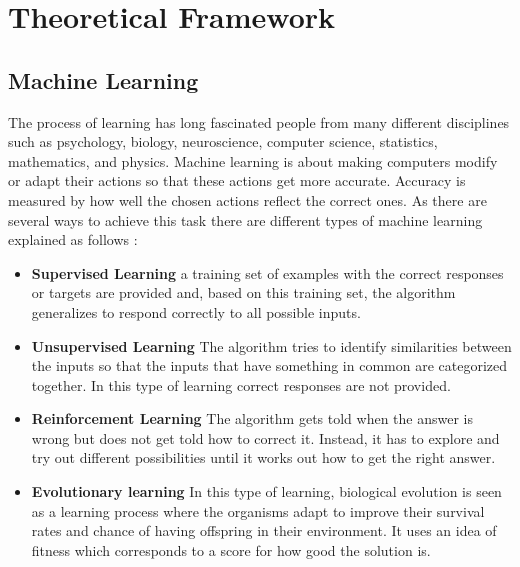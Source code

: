 \chapter{Theoretical Framework}
\label{ch:theosm}



\section{Machine Learning}

The process of learning has long fascinated people from many different disciplines such as psychology, biology, neuroscience, computer science, statistics, mathematics, and physics. 
Machine learning is about making computers modify or adapt their actions so that these actions get more accurate. Accuracy is measured by how well the chosen actions reflect the correct ones. As there are several ways to achieve this task there are different types of machine learning explained as follows \cite{marsland2015machine}:

\begin{itemize}
\item \textbf{Supervised Learning} a training set of examples with the correct responses or targets are provided and, based on this training set, the algorithm generalizes to respond correctly to all possible inputs.

\item \textbf{Unsupervised Learning} The algorithm tries to identify similarities between the inputs so that the inputs that have something in common are categorized together. In this type of learning correct responses are not provided.

\item \textbf{Reinforcement Learning} The algorithm gets told when the answer is wrong but does not get told how to correct it. Instead, it has to explore and try out different possibilities until it works out how to get the right answer. 

\item \textbf{Evolutionary learning} In this type of learning, biological evolution is seen as a learning process where the organisms adapt to improve their survival rates and chance of having offspring in their environment. It uses an idea of fitness which corresponds to a score for how good the solution is. 
\end{itemize}

